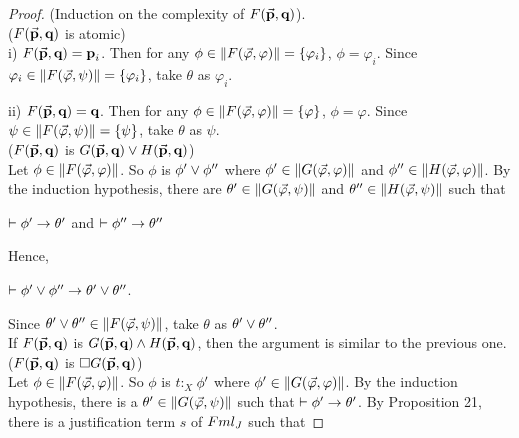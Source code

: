 \begin{proof} (Induction on the complexity of $F(\vec{\textbf{p}},\textbf{q})$).\\
	
	
	($F(\vec{\textbf{p}},\textbf{q})$ is atomic)\\
	
	\qquad i) $F(\vec{\textbf{p}},\textbf{q}) = \textbf{p}_{i}$. Then for any $\phi \in \Arrowvert F(\vec{\varphi},\varphi) \Arrowvert = \{ \varphi_{i}\}$, $\phi = \varphi_{i}$. Since $\varphi_{i} \in  \Arrowvert F(\vec{\varphi},\psi) \Arrowvert = \{ \varphi_{i}\}$, take $\theta$ as $\varphi_{i}$. 
	
	\qquad ii) $F(\vec{\textbf{p}},\textbf{q}) = \textbf{q}$. Then for any $\phi \in \Arrowvert F(\vec{\varphi},\varphi) \Arrowvert = \{ \varphi\}$, $\phi = \varphi$. Since $\psi \in  \Arrowvert F(\vec{\varphi},\psi) \Arrowvert = \{ \psi\}$, take $\theta$ as $\psi$. \\
	
	
	
	($F(\vec{\textbf{p}},\textbf{q})$ is $G(\vec{\textbf{p}}, \textbf{q})\vee H(\vec{\textbf{p}}, \textbf{q})$)\\
	
	\qquad Let $\phi \in \Arrowvert F(\vec{\varphi},\varphi) \Arrowvert$. So $\phi$ is $\phi^{\prime} \vee \phi^{\prime\prime}$ where  $\phi^{\prime} \in \Arrowvert G(\vec{\varphi},\varphi) \Arrowvert$ and  $\phi^{\prime\prime} \in \Arrowvert H(\vec{\varphi},\varphi) \Arrowvert$. By the induction hypothesis, there are $\theta^{\prime} \in \Arrowvert G(\vec{\varphi},\psi) \Arrowvert$ and  $\theta^{\prime\prime} \in \Arrowvert H(\vec{\varphi},\psi) \Arrowvert$ such that
	
	\begin{center}
		$\vdash \phi^{\prime} \rightarrow \theta^{\prime}$ and $\vdash \phi^{\prime\prime} \rightarrow \theta^{\prime\prime}$
	\end{center}
Hence,
	
	\begin{center}
		$\vdash \phi^{\prime} \vee \phi^{\prime\prime}  \rightarrow \theta^{\prime} \vee \theta^{\prime\prime}$.
	\end{center}
	
	\qquad Since $\theta^{\prime} \vee \theta^{\prime\prime} \in \Arrowvert F(\vec{\varphi},\psi) \Arrowvert$, take $\theta$ as $\theta^{\prime} \vee \theta^{\prime\prime}$. \\
	
	\qquad If $F(\vec{\textbf{p}},\textbf{q})$ is $G(\vec{\textbf{p}}, \textbf{q})\wedge H(\vec{\textbf{p}}, \textbf{q})$, then the argument is similar to the previous one.\\
	
	($F(\vec{\textbf{p}},\textbf{q})$ is $\Box G(\vec{\textbf{p}}, \textbf{q})$)\\
	
	
	\qquad Let $\phi \in \Arrowvert F(\vec{\varphi},\varphi) \Arrowvert$. So $\phi$ is $t$$:_{X}$$\phi^{\prime}$ where $\phi^{\prime} \in \Arrowvert G(\vec{\varphi},\varphi) \Arrowvert$. By the induction hypothesis, there is a $\theta^{\prime} \in \Arrowvert G(\vec{\varphi},\psi) \Arrowvert$ such that $\vdash \phi^{\prime} \rightarrow \theta^{\prime}$. By Proposition 21, there is a justification term $s$ of $Fml_{J}$ such that
	

\end{proof}
